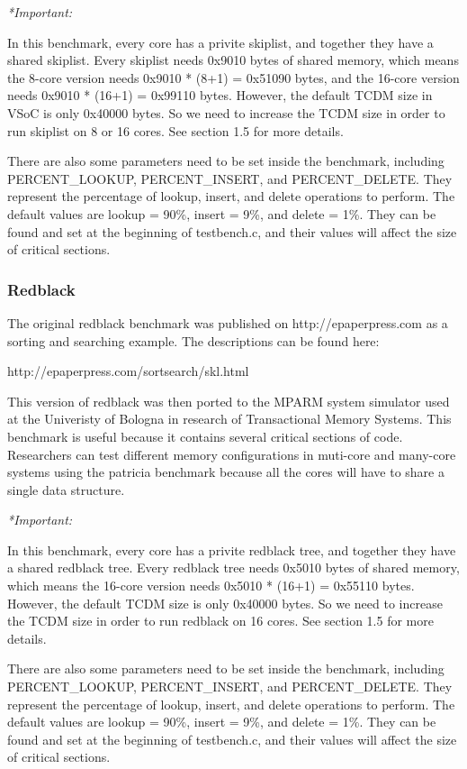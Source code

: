 \documentclass{article}
\begin{document}
\vspace{2mm}
\emph{*Important:} 

In this benchmark, every core has a privite skiplist, and together they have a
shared skiplist. Every skiplist needs 0x9010 bytes of shared memory, which 
means the 8-core version needs 0x9010 * (8+1) = 0x51090 bytes,
and the 16-core version needs 0x9010 * (16+1) = 0x99110 bytes. However, the 
default TCDM size in VSoC is only 0x40000 bytes. So we need to 
increase the TCDM size in order to run skiplist on 8 or 16 cores.
 See section 1.5 for more details.

There are also some parameters need to be set inside the benchmark, including 
 PERCENT\_LOOKUP, PERCENT\_INSERT, and PERCENT\_DELETE. They 
represent the percentage of lookup, insert, and delete operations to perform.
The default values are lookup = 90\%, insert = 9\%, and 
delete = 1\%. They can be found and set at the beginning of testbench.c,
and their values will affect the size of critical sections. 

\subsubsection{Redblack}


The original redblack benchmark was published on http://epaperpress.com
as a sorting and searching example. The descriptions can be found here:

http://epaperpress.com/sortsearch/skl.html

This version of redblack was then ported to the MPARM system simulator used at 
the Univeristy of Bologna in research of Transactional Memory Systems. This
benchmark is useful because it contains several critical sections of code. 
Researchers can test different memory configurations in muti-core and many-core 
systems using the patricia benchmark because all the cores will have to share a 
single data structure. 

\vspace{2mm}
\emph{*Important:} 

In this benchmark, every core has a privite redblack tree, and together they 
have a shared redblack tree. Every redblack tree needs 0x5010 bytes of shared 
memory, which means the 16-core version needs 0x5010 * (16+1) = 0x55110 bytes. 
However, the default TCDM size is only 0x40000 bytes. 
So we need to increase the TCDM size in order to run redblack on 16 cores. 
See section 1.5 for more details.

There are also some parameters need to be set inside the benchmark, including 
 PERCENT\_LOOKUP, PERCENT\_INSERT, and PERCENT\_DELETE. They 
represent the percentage of lookup, insert, and delete operations to perform.
The default values are lookup = 90\%, insert = 9\%, and 
delete = 1\%. They can be found and set at the beginning of testbench.c,
and their values will affect the size of critical sections. 
\end{document}
